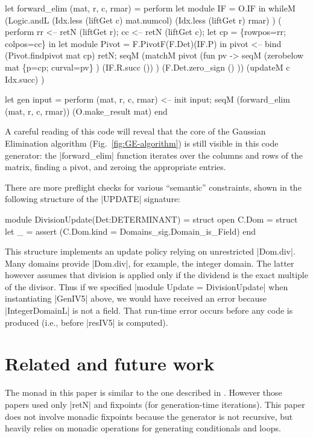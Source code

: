 \documentclass{elsart}
\begin{document}
\begin{code2}
 let forward_elim (mat, r, c, rmar) = perform
    let module IF = O.IF in
      whileM (Logic.andL (Idx.less (liftGet c) mat.numcol)
                          (Idx.less (liftGet r) rmar) )
       ( perform
       rr <-- retN (liftGet r);
       cc <-- retN (liftGet c);
       let cp  = \{rowpos=rr; colpos=cc\} in
       let module Pivot = F.PivotF(F.Det)(IF.P) in
       pivot <-- bind (Pivot.findpivot mat cp) retN;
       seqM (matchM pivot (fun pv -> 
              seqM (zerobelow mat \{p=cp; curval=pv\} )
                   (IF.R.succ ()) )
              (F.Det.zero_sign () ))
            (updateM c Idx.succ) )

 let gen input = perform
    (mat, r, c, rmar) <-- init input;
    seqM 
      (forward_elim (mat, r, c, rmar))
      (O.make_result mat)
end
\end{code2}

A careful reading of this code will reveal that the core of the 
Gaussian Elimination algorithm (Fig.~\ref{fig:GE-algorithm}) 
is still visible in this code generator:
the |forward_elim| function iterates over the columns and rows of the
matrix, finding a pivot, and zeroing the appropriate entries.

There are more preflight checks for various ``semantic'' constraints, shown
in the following structure of the |UPDATE| signature:
\begin{code}
module DivisionUpdate(Det:DETERMINANT) =
  struct
  open C.Dom = struct 
  let _ = assert (C.Dom.kind = Domains_sig.Domain_is_Field)
end
\end{code}
%
This structure implements an update policy relying on
unrestricted |Dom.div|. Many domains provide |Dom.div|, for example,
the integer domain. The latter however assumes that division is applied
only if the dividend is the exact multiple of the divisor. Thus if we
specified |module Update = DivisionUpdate| when instantiating |GenIV5|
above, we would have received an error because |IntegerDomainL| is not
a field. That run-time error occurs before any code is produced (i.e.,
before |resIV5| is computed).

\section{Related and future work}\label{related}

The monad in this paper is similar to the one described in
\cite{SwadiMonadic06,KiselyovTaha}.  However those papers used only
|retN| and fixpoints (for generation-time iterations).  This paper
does not involve monadic fixpoints because the generator is not
recursive, but heavily relies on monadic operations for generating
conditionals and loops.
\end{document}
